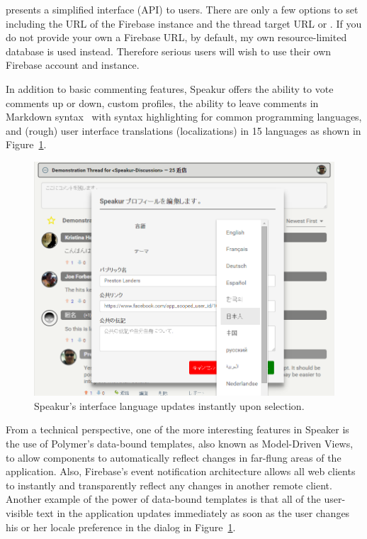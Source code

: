  presents a simplified interface (API) to users.
There are only a few options to set including the URL of the Firebase instance and the thread target URL or .
If you do not provide your own a Firebase URL, by default, my own resource-limited database is used instead.
Therefore serious users will wish to use their own Firebase account and instance.

In addition to basic commenting features, Speakur offers the ability to vote comments up or down, custom profiles, 
the ability to leave comments in Markdown syntax~\cite{githubcontributors2015} with syntax highlighting for common programming languages, 
and (rough) user interface translations 
(localizations) 
in 15 languages as shown in Figure~\ref{f:lang}.

\begin{figure}[htb]
\centering
 \includegraphics[width=5.5in]{images/screenshot_20150320_1923_lang.png}
\caption{Speakur's interface language updates instantly upon selection.}
\label{f:lang}
\end{figure}

From a technical perspective, one of the more interesting features in Speaker is the use of Polymer's data-bound templates, also known as Model-Driven Views, 
to allow components to automatically reflect changes in far-flung areas of the application.
Also, Firebase's event notification architecture allows all web clients to instantly and transparently reflect any changes in another remote client.
Another example of the power of data-bound templates is that all of the user-visible text in the application updates immediately as soon as the user changes his or her locale preference in the dialog in Figure~\ref{f:lang}.

